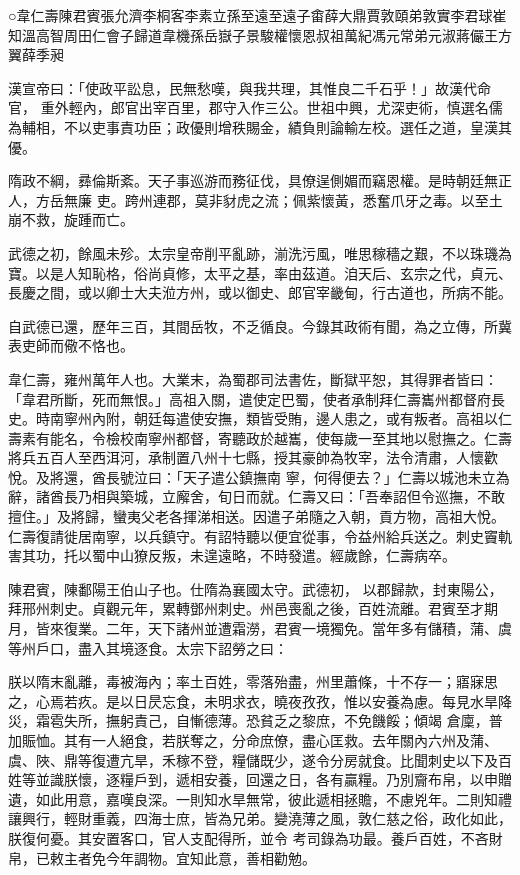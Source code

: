 
\begin{pinyinscope}

 ○韋仁壽陳君賓張允濟李桐客李素立孫至遠至遠子畬薛大鼎賈敦頤弟敦實李君球崔知溫高智周田仁會子歸道韋機孫岳嶽子景駿權懷恩叔祖萬紀馮元常弟元淑蔣儼王方翼薛季昶



 漢宣帝曰：「使政平訟息，民無愁嘆，與我共理，其惟良二千石乎！」故漢代命
 官，
 重外輕內，郎官出宰百里，郡守入作三公。世祖中興，尤深吏術，慎選名儒為輔相，不以吏事責功臣；政優則增秩賜金，績負則論輸左校。選任之道，皇漢其優。



 隋政不綱，彞倫斯紊。天子事巡游而務征伐，具僚逞側媚而竊恩權。是時朝廷無正人，方岳無廉
 吏。跨州連郡，莫非豺虎之流；佩紫懷黃，悉奮爪牙之毒。以至土崩不救，旋踵而亡。



 武德之初，餘風未殄。太宗皇帝削平亂跡，湔洗污風，唯思稼穡之艱，不以珠璣為寶。以是人知恥格，俗尚貞修，太平之基，率由茲道。洎天后、玄宗之代，貞元、長慶之間，或以卿士大夫涖方州，或以御史、郎官宰畿甸，行古道也，所病不能。



 自武德已還，歷年三百，其間岳牧，不乏循良。今錄其政術有聞，為之立傳，所冀表吏師而儆不恪也。



 韋仁壽，雍州萬年人也。大業末，為蜀郡司法書佐，斷獄平恕，其得罪者皆曰：「韋君所斷，死而無恨。」高祖入關，遣使定巴蜀，使者承制拜仁壽巂州都督府長史。時南寧州內附，朝廷每遣使安撫，類皆受賄，邊人患之，或有叛者。高祖以仁壽素有能名，令檢校南寧州都督，寄聽政於越巂，使每歲一至其地以慰撫之。仁壽將兵五百人至西洱河，承制置八州十七縣，授其豪帥為牧宰，法令清肅，人懷歡悅。及將還，酋長號泣曰：「天子遣公鎮撫南
 寧，何得便去？」仁壽以城池未立為辭，諸酋長乃相與築城，立廨舍，旬日而就。仁壽又曰：「吾奉詔但令巡撫，不敢擅住。」及將歸，蠻夷父老各揮涕相送。因遣子弟隨之入朝，貢方物，高祖大悅。仁壽復請徙居南寧，以兵鎮守。有詔特聽以便宜從事，令益州給兵送之。刺史竇軌害其功，托以蜀中山獠反叛，未遑遠略，不時發遣。經歲餘，仁壽病卒。



 陳君賓，陳鄱陽王伯山子也。仕隋為襄國太守。武德初，
 以郡歸款，封東陽公，拜邢州刺史。貞觀元年，累轉鄧州刺史。州邑喪亂之後，百姓流離。君賓至才期月，皆來復業。二年，天下諸州並遭霜澇，君賓一境獨免。當年多有儲積，蒲、虞等州戶口，盡入其境逐食。太宗下詔勞之曰：



 朕以隋末亂離，毒被海內；率土百姓，零落殆盡，州里蕭條，十不存一；寤寐思之，心焉若疚。是以日昃忘食，未明求衣，曉夜孜孜，惟以安養為慮。每見水旱降災，霜雹失所，撫躬責己，自慚德薄。恐貧乏之黎庶，不免饑餒；傾竭
 倉廩，普加賑恤。其有一人絕食，若朕奪之，分命庶僚，盡心匡救。去年關內六州及蒲、虞、陜、鼎等復遭亢旱，禾稼不登，糧儲既少，遂令分房就食。比聞刺史以下及百姓等並識朕懷，逐糧戶到，遞相安養，回還之日，各有贏糧。乃別齎布帛，以申贈遺，如此用意，嘉嘆良深。一則知水旱無常，彼此遞相拯贍，不慮兇年。二則知禮讓興行，輕財重義，四海士庶，皆為兄弟。變澆薄之風，敦仁慈之俗，政化如此，朕復何憂。其安置客口，官人支配得所，並令
 考司錄為功最。養戶百姓，不吝財帛，已敕主者免今年調物。宜知此意，善相勸勉。




\end{pinyinscope}
